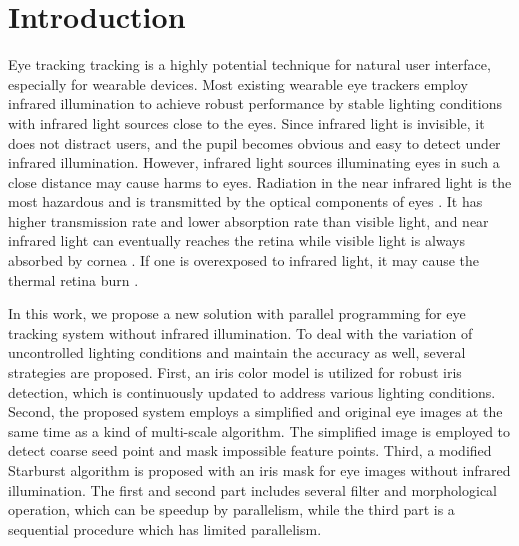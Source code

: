 \documentclass[sigconf]{acmart}
\begin{document}
%

%
\maketitle

\section{Introduction}
\label{sec:intro}
Eye tracking tracking is a highly potential technique for natural user interface, especially for wearable devices. Most existing wearable eye trackers employ infrared illumination to achieve robust performance
by stable lighting conditions with infrared light sources close to the eyes. Since infrared light is invisible, it does not distract users, and the pupil becomes obvious and easy to detect under infrared illumination.  However, infrared light sources illuminating eyes in such a close distance may cause harms to eyes. Radiation in the near infrared light is the most hazardous and is transmitted by the optical components of eyes \cite{seeber2007light}. It has higher transmission rate and lower absorption rate than visible light, and near infrared light can eventually reaches the retina while visible light is always absorbed by cornea \cite{Teaching}. If one is overexposed to infrared light, it may cause the thermal retina burn \cite{doi:10.1080/713820456}. 

In this work, we propose a new solution with parallel programming for eye tracking system without infrared illumination. To deal with the variation of uncontrolled lighting conditions and maintain the accuracy as well,
several strategies are proposed. First, an iris color model is utilized for robust iris detection, which is continuously updated to address various lighting conditions. Second, the proposed system employs a simplified and original eye images at the same time as a kind of multi-scale algorithm. The simplified image is employed to detect coarse seed point and mask impossible feature points. Third, a modified Starburst algorithm is proposed with an iris mask for eye images without infrared illumination. The first and second part includes several filter and morphological operation, which can be speedup by parallelism, while the third part is a sequential procedure which has limited parallelism.
\end{document}

